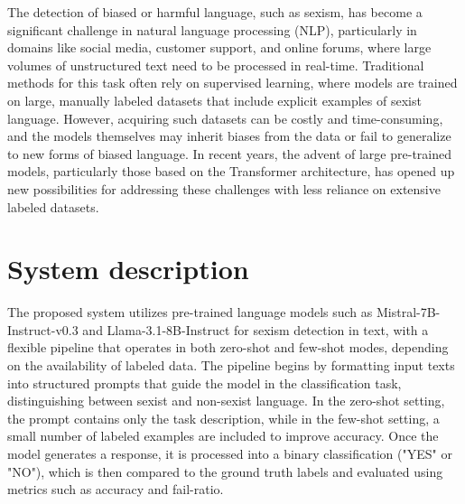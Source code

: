 \documentclass[11pt]{article}
\begin{document}
The detection of biased or harmful language, such as sexism, has become a significant challenge in natural language processing (NLP), particularly in domains like social media, customer support, and online forums, where large volumes of unstructured text need to be processed in real-time. Traditional methods for this task often rely on supervised learning, where models are trained on large, manually labeled datasets that include explicit examples of sexist language. However, acquiring such datasets can be costly and time-consuming, and the models themselves may inherit biases from the data or fail to generalize to new forms of biased language. In recent years, the advent of large pre-trained models, particularly those based on the Transformer architecture, has opened up new possibilities for addressing these challenges with less reliance on extensive labeled datasets.


\section{System description}
\label{sec:system}

The proposed system utilizes pre-trained language models such as Mistral-7B-Instruct-v0.3 and Llama-3.1-8B-Instruct for sexism detection in text, with a flexible pipeline that operates in both zero-shot and few-shot modes, depending on the availability of labeled data. The pipeline begins by formatting input texts into structured prompts that guide the model in the classification task, distinguishing between sexist and non-sexist language. In the zero-shot setting, the prompt contains only the task description, while in the few-shot setting, a small number of labeled examples are included to improve accuracy. Once the model generates a response, it is processed into a binary classification ("YES" or "NO"), which is then compared to the ground truth labels and evaluated using metrics such as accuracy and fail-ratio.
\end{document}
